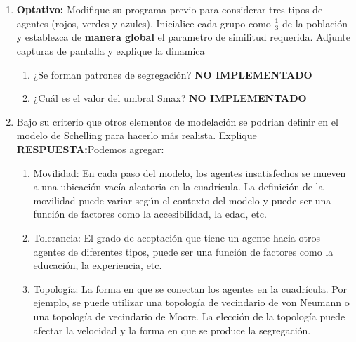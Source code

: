 \documentclass[12pt]{article}
\begin{document}
\begin{enumerate}
\begin{enumerate}
    \end{enumerate}

    \item \textbf{Optativo:} Modifique su programa previo para considerar tres tipos de agentes (rojos, verdes y azules). Inicialice cada grupo como $\frac{1}{3}$ de la población y establezca de \textbf{manera global}
    el parametro de similitud requerida. Adjunte capturas de pantalla y explique la dinamica\\
    \begin{enumerate}
        \item ¿Se forman patrones de segregación? \textbf{NO IMPLEMENTADO}
        \item ¿Cuál es el valor del umbral Smax? \textbf{NO IMPLEMENTADO}
    \end{enumerate}
    \item Bajo su criterio que otros elementos de modelación se podrian definir en el modelo de Schelling para hacerlo más realista. Explique\\
    
    \textbf{\color{red} RESPUESTA:}Podemos agregar:\\
    \begin{enumerate}
        \item Movilidad: En cada paso del modelo, los agentes insatisfechos se mueven a una ubicación vacía aleatoria en la cuadrícula. La definición de la movilidad puede variar según el contexto del modelo y puede ser una función de factores como la accesibilidad, la edad, etc.
        \item Tolerancia: El grado de aceptación que tiene un agente hacia otros agentes de diferentes tipos, puede ser una función de factores como la educación, la experiencia, etc.
        \item Topología: La forma en que se conectan los agentes en la cuadrícula. Por ejemplo, se puede utilizar una topología de vecindario de von Neumann o una topología de vecindario de Moore. La elección de la topología puede afectar la velocidad y la forma en que se produce la segregación.
    \end{enumerate}


\end{enumerate}
\end{document}
